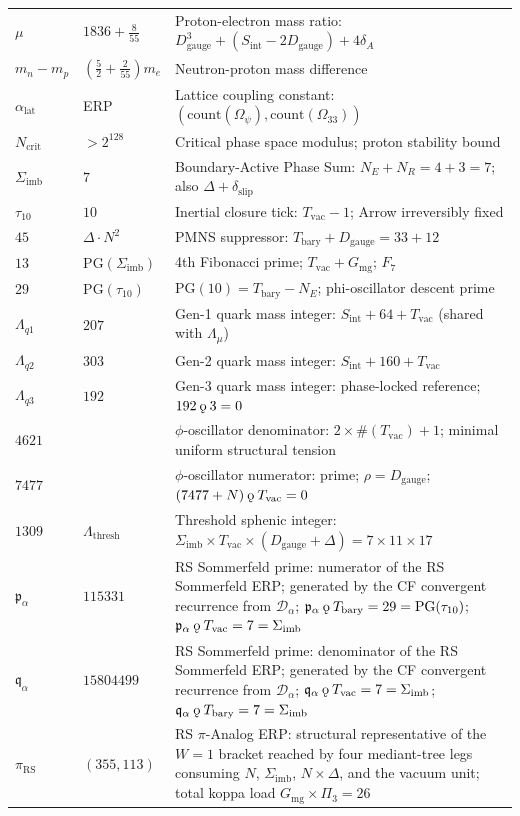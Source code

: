 \documentclass[11pt, letterpaper]{article}
\newcommand{\rank}{\rho}
\newcommand{\koppa}{\mathbin{\text{\rm\k{o}}}}
\newcommand{\Tbary}{T_{\mathrm{bary}}}
\newcommand{\Dg}{D_{\mathrm{gauge}}}
\newcommand{\Sint}{S_{\mathrm{int}}}
\newcommand{\Lalpha}{\alpha_{\mathrm{lat}}}
\newcommand{\Sigimb}{\Sigma_{\mathrm{imb}}}
\newcommand{\PG}{\mathrm{PG}}
\newcommand{\Gmg}{G_{\mathrm{mg}}}
\newcommand{\Tvac}{T_{\mathrm{vac}}}
\newcommand{\tauX}{\tau_{10}}
\newcommand{\Pithree}{\Pi_3}
\newcommand{\piRS}{\pi_{\mathrm{RS}}}
\newcommand{\pa}{\mathfrak{p}_\alpha}
\newcommand{\qa}{\mathfrak{q}_\alpha}
\newcommand{\Da}{\mathcal{D}_\alpha}
\theoremstyle{definition}
\theoremstyle{plain}
\begin{document}
\begin{longtable}{L{2.8cm} L{2.3cm} L{8.0cm}}
$\mu$ & $1836+\tfrac{8}{55}$ & Proton-electron mass ratio:
  $\Dg^3+(\Sint-2\Dg)+4\delta_A$ \\[3pt]
$m_n-m_p$ & $(\tfrac{5}{2}+\tfrac{2}{55})m_e$ &
  Neutron-proton mass difference \\[3pt]
$\Lalpha$ & ERP & Lattice coupling constant:
  $(\mathrm{count}(\Omega_\psi),\mathrm{count}(\Omega_{33}))$ \\[3pt]
$N_{\mathrm{crit}}$ & $>2^{128}$ & Critical phase space modulus;
  proton stability bound \\[3pt]
$\Sigimb$ & $7$ & Boundary-Active Phase Sum:
  $N_E+N_R=4+3=7$; also $\Delta+\delta_{\mathrm{slip}}$ \\[3pt]
$\tau_{10}$ & $10$ & Inertial closure tick:
  $T_{\mathrm{vac}}-1$; Arrow irreversibly fixed \\[3pt]
$45$ & $\Delta\cdot N^2$ & PMNS suppressor:
  $\Tbary+\Dg=33+12$ \\[3pt]
$13$ & $\PG(\Sigimb)$ & 4th Fibonacci prime;
  $T_{\mathrm{vac}}+G_{\mathrm{mg}}$; $F_7$ \\[3pt]
$29$ & $\PG(\tau_{10})$ & $\PG(10)=\Tbary-N_E$;
  phi-oscillator descent prime \\[3pt]
$\Lambda_{q1}$ & $207$ & Gen-1 quark mass integer:
  $\Sint+64+T_{\mathrm{vac}}$ (shared with $\Lambda_\mu$) \\[3pt]
$\Lambda_{q2}$ & $303$ & Gen-2 quark mass integer:
  $\Sint+160+T_{\mathrm{vac}}$ \\[3pt]
$\Lambda_{q3}$ & $192$ & Gen-3 quark mass integer:
  phase-locked reference; $192\koppa 3=0$ \\[3pt]
$4621$ & & $\phi$-oscillator denominator:
  $2\times\#(T_{\mathrm{vac}})+1$; minimal uniform structural tension \\[3pt]
$7477$ & & $\phi$-oscillator numerator:
  prime; $\rank=\Dg$; $(7477+N)\koppa T_{\mathrm{vac}}=0$ \\[3pt]
$1309$ & $\Lambda_{\mathrm{thresh}}$ & Threshold sphenic integer:
  $\Sigimb\times T_{\mathrm{vac}}\times(\Dg+\Delta)=7\times11\times17$ \\[3pt]
$\pa$ & $115331$ & RS Sommerfeld prime: numerator of the RS Sommerfeld ERP;
  generated by the CF convergent recurrence from $\Da$;
  $\pa\koppa\Tbary=29=\PG(\tauX)$; $\pa\koppa\Tvac=7=\Sigimb$ \\[3pt]
$\qa$ & $15804499$ & RS Sommerfeld prime: denominator of the RS Sommerfeld ERP;
  generated by the CF convergent recurrence from $\Da$;
  $\qa\koppa\Tvac=7=\Sigimb$; $\qa\koppa\Tbary=7=\Sigimb$ \\[3pt]
$\piRS$ & $(355,113)$ & RS $\pi$-Analog ERP: structural representative of the
  $W=1$ bracket reached by four mediant-tree legs consuming $N$, $\Sigimb$,
  $N\times\Delta$, and the vacuum unit; total koppa load
  $\Gmg\times\Pithree=26$ \\[3pt]
\end{longtable}
\end{document}
